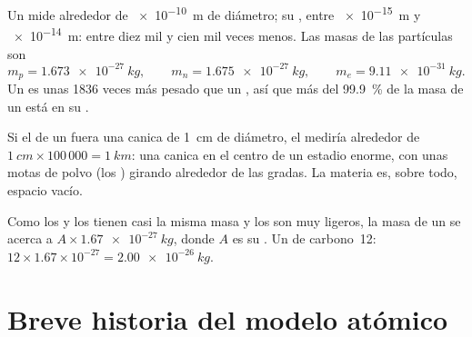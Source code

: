 \begin{proposition}\label{prop:g9:inside-the-atom:sizes}
Un  mide alrededor de \qty{e-10}{m} de diámetro; su , entre
\qty{e-15}{m} y \qty{e-14}{m}: entre diez mil y cien mil veces menos.
Las masas de las partículas son
\[
  m_p = \qty{1.673e-27}{kg},\qquad m_n = \qty{1.675e-27}{kg},\qquad
  m_e = \qty{9.11e-31}{kg}.
\]
Un  es unas 1836 veces más pesado que un , así que más del
\qty{99.9}{\percent} de la masa de un  está en su .
\end{proposition}

\begin{example}\label{ex:g9:inside-the-atom:marble}
Si el  de un  fuera una canica de \qty{1}{cm} de diámetro, el
 mediría alrededor de $\qty{1}{cm} \times 100\,000 = \qty{1}{km}$:
una canica en el centro de un estadio enorme, con unas motas de polvo
(los ) girando alrededor de las gradas. La materia es, sobre
todo, espacio vacío.
\end{example}

\begin{method}\label{met:g9:inside-the-atom:mass}
Como los  y los  tienen casi la misma masa y los
 son muy ligeros, la masa de un  se acerca a $A \times
\qty{1.67e-27}{kg}$, donde $A$ es su . Un  de
carbono~12:
$12 \times 1.67 \times 10^{-27} = \qty{2.00e-26}{kg}$.
\end{method}

\section{Breve historia del modelo atómico}

